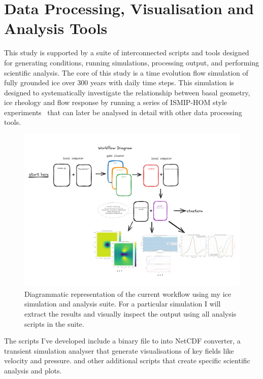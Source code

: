\section{Data Processing, Visualisation and Analysis Tools}\label{analysis_tools}
This study is supported by a suite of interconnected scripts and tools designed for generating conditions, running simulations, processing output, and performing scientific analysis.
The core of this study is a time evolution flow simulation of fully grounded ice over 300 years with daily time steps. This simulation is designed to systematically investigate the relationship between basal geometry, ice rheology and flow response by running a series of ISMIP-HOM style experiments~\cite{Pattyn_2008} that can later be analysed in detail with other data processing tools.
\begin{figure}[H]
    \includegraphics[scale=0.55]{figures/workflow_diagram.pdf}
    \caption{Diagrammatic representation of the current workflow using my ice simulation and analysis suite. For a particular simulation I will extract the results and visually inspect the output using  all analysis scripts in the suite.}\label{fig:workflow}
\end{figure}
The scripts I've developed include a binary file to into NetCDF converter, a transient simulation analyser that generate visualisations of key fields like velocity and pressure. and other additional scripts that create specific scientific analysis and plots.
